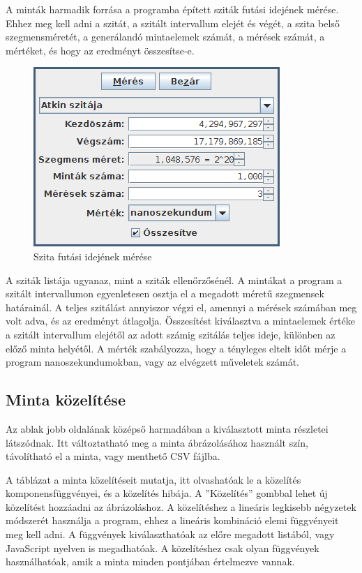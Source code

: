 A minták harmadik forrása a programba épített sziták futási idejének mérése.
Ehhez meg kell adni a szitát, a szitált intervallum elejét és végét, a szita belső szegmensméretét, a generálandó mintaelemek számát, a mérések számát, a mértéket, és hogy az eredményt összesítse-e.

\begin{figure}[h]
\caption{Szita futási idejének mérése}
\centering
\includegraphics[scale=1.0]{measure.png}
\end{figure}

A sziták listája ugyanaz, mint a sziták ellenőrzősénél.
A mintákat a program a szitált intervallumon egyenletesen osztja el a megadott méretű szegmensek határainál.
A teljes szitálást annyiszor végzi el, amennyi a mérések számában meg volt adva, és az eredményt átlagolja.
Összesítést kiválasztva a mintaelemek értéke a szitált intervallum elejétől az adott számig szitálás teljes ideje, különben az előző minta helyétől.
A mérték szabályozza, hogy a tényleges eltelt időt mérje a program nanoszekundumokban, vagy az elvégzett műveletek számát.

\subsection{Minta közelítése}

Az ablak jobb oldalának középső harmadában a kiválasztott minta részletei látszódnak.
Itt változtatható meg a minta ábrázolásához használt szín, távolítható el a minta, vagy menthető CSV fájlba.

A táblázat a minta közelítéseit mutatja, itt olvashatóak le a közelítés komponensfüggvényei, és a közelítés hibája.
A ''Közelítés'' gombbal lehet új közelítést hozzáadni az ábrázoláshoz.
A közelítéshez a lineáris legkisebb négyzetek módszerét használja a program, ehhez a lineáris kombináció elemi függvényeit meg kell adni.
A függvények kiválaszthatóak az előre megadott listából, vagy JavaScript nyelven is megadhatóak.
A közelítéshez csak olyan függvények használhatóak, amik a minta minden pontjában értelmezve vannak.

